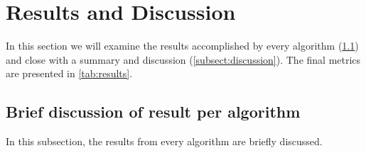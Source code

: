 \section{Results and Discussion}\label{sect:results-and-discussion}
In this section we will examine the results accomplished by every algorithm
(\cref{subsect:brief-algo-discussion}) and close with a summary and discussion
(\cref{subsect:discussion}). The final metrics are presented in \cref{tab:results}.

\subsection{Brief discussion of result per algorithm}\label{subsect:brief-algo-discussion}
In this subsection, the results from every algorithm are briefly discussed.

